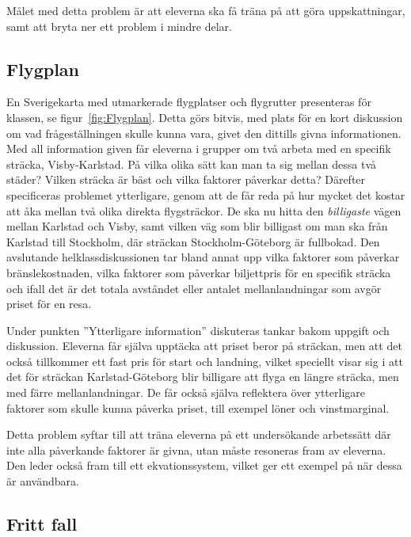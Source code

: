     \textcolor{lila}{Målet med detta problem är att eleverna ska få träna på att göra uppskattningar, samt att bryta ner ett problem i mindre delar.}
    
    

\subsection{Flygplan}
    \label{sec:Flygplan}
    
    \textcolor{lila}{En Sverigekarta med utmarkerade flygplatser och flygrutter presenteras för klassen, se figur~\ref{fig:Flygplan}. Detta görs bitvis, med plats för en kort diskussion om vad frågeställningen skulle kunna vara, givet den dittills givna informationen. Med all information given får eleverna i grupper om två arbeta med en specifik sträcka, Visby-Karlstad. På vilka olika sätt kan man ta sig mellan dessa två städer? Vilken sträcka är bäst och vilka faktorer påverkar detta? Därefter specificeras problemet ytterligare, genom att de får reda på hur mycket det kostar att åka mellan två olika direkta flygsträckor. De ska nu hitta den \textsl{billigaste} vägen mellan Karlstad och Visby, samt vilken väg som blir billigast om man ska från Karlstad till Stockholm, där sträckan Stockholm-Göteborg är fullbokad. Den avslutande helklassdiskussionen tar bland annat upp vilka faktorer som påverkar bränslekostnaden, vilka faktorer som påverkar biljettpris för en specifik sträcka och ifall det är det totala avståndet eller antalet mellanlandningar som avgör priset för en resa.}
    
    \textcolor{lila}{Under punkten ''Ytterligare information'' diskuteras tankar bakom uppgift och diskussion. Eleverna får själva upptäcka att priset beror på sträckan, men att det också tillkommer ett fast pris för start och landning, vilket speciellt visar sig i att det för sträckan Karlstad-Göteborg blir billigare att flyga en längre sträcka, men med färre mellanlandningar. De får också själva reflektera över ytterligare faktorer som skulle kunna påverka priset, till exempel löner och vinstmarginal.}
    
    \textcolor{lila}{Detta  problem syftar till att träna eleverna på ett undersökande arbetssätt där inte alla påverkande faktorer är givna, utan måste resoneras fram av eleverna. Den leder också fram till ett ekvationssystem, vilket ger ett exempel på när dessa är användbara.}
    
    
    
\subsection{Fritt fall}
    \label{sec:FrittFall}
    
